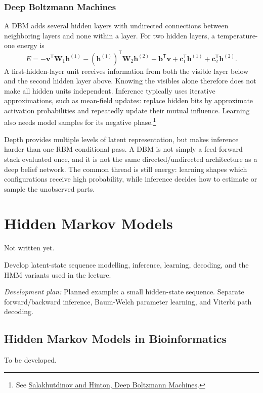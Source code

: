 \documentclass[11pt, oneside]{book}
\newcommand{\T}{^{\mathsf{T}}}           %
\let\originalsection\section
\renewcommand{\section}{\Needspace{7\baselineskip}\originalsection}
\let\originalsubsection\subsection
\renewcommand{\subsection}{\Needspace{6\baselineskip}\originalsubsection}
\begin{document}
\subsection{Deep Boltzmann Machines}\label{sec:source-10-3-3}
A DBM adds several hidden layers with undirected connections between neighboring layers and none within a layer. For two hidden layers, a temperature-one energy is
\[
 E=-\mathbf{v}\T\mathbf{W}_1\mathbf{h}^{(1)}
   -(\mathbf{h}^{(1)})\T\mathbf{W}_2\mathbf{h}^{(2)}
   +\mathbf{b}\T\mathbf{v}+\mathbf{c}_1\T\mathbf{h}^{(1)}
   +\mathbf{c}_2\T\mathbf{h}^{(2)}.
\]
A first-hidden-layer unit receives information from both the visible layer below and the second hidden layer above. Knowing the visibles alone therefore does not make all hidden units independent. Inference typically uses iterative approximations, such as mean-field updates: replace hidden bits by approximate activation probabilities and repeatedly update their mutual influence. Learning also needs model samples for its negative phase.\footnote{See \href{https://proceedings.mlr.press/v5/salakhutdinov09a.html}{Salakhutdinov and Hinton, Deep Boltzmann Machines}.}

Depth provides multiple levels of latent representation, but makes inference harder than one RBM conditional pass. A DBM is not simply a feed-forward stack evaluated once, and it is not the same directed/undirected architecture as a deep belief network. The common thread is still energy: learning shapes which configurations receive high probability, while inference decides how to estimate or sample the unobserved parts.

\chapter{Hidden Markov Models}\label{ch:source-11}

{\small\color{gray!70!black} Not written yet.}

Develop latent-state sequence modelling, inference, learning, decoding, and the HMM variants used in the lecture.

\textit{Development plan:} Planned example: a small hidden-state sequence. Separate forward/backward inference, Baum-Welch parameter learning, and Viterbi path decoding.

\section{Hidden Markov Models in Bioinformatics}\label{sec:source-11-1}
{\small\color{gray!70!black} To be developed.}
\end{document}
